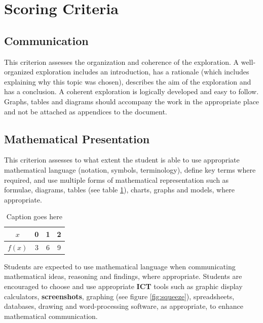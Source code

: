 \documentclass[11pt]{article}
\begin{document}
\section{Scoring Criteria}

\subsection{Communication}

This criterion assesses the organization and coherence of the exploration. 
A well-organized exploration includes an introduction, has a rationale 
(which includes explaining why this topic was chosen), describes the aim 
of the exploration and has a conclusion. A coherent exploration is logically 
developed and easy to follow. Graphs, tables and diagrams should accompany 
the work in the appropriate place and not be attached as appendices to the document.

\subsection{Mathematical Presentation}

This criterion assesses to what extent the student is able to use appropriate 
mathematical language (notation, symbols, terminology), define key terms where 
required, and use multiple forms of mathematical representation such as formulae, 
diagrams, tables (see table \ref{tab:data1}), charts, graphs and models, where appropriate.

\begin{table}[H]
    \centering
    \begin{tabular}{|c|c|c|c|} \hline
        $x$ & 0 & 1 & 2 \\ \hline
        $f(x)$ & 3 & 6 & 9 \\ \hline
    \end{tabular}
    \caption{Caption goes here}
    \label{tab:data1}
\end{table}

Students are expected to use mathematical language when communicating 
mathematical ideas, reasoning and findings, where appropriate. Students 
are encouraged to choose and use appropriate \textbf{ICT} tools such as 
graphic display calculators, \textbf{screenshots}, graphing (see figure \ref{fig:squeeze}), spreadsheets, 
databases, drawing and word-processing software, as appropriate, to 
enhance mathematical communication.
\end{document}
